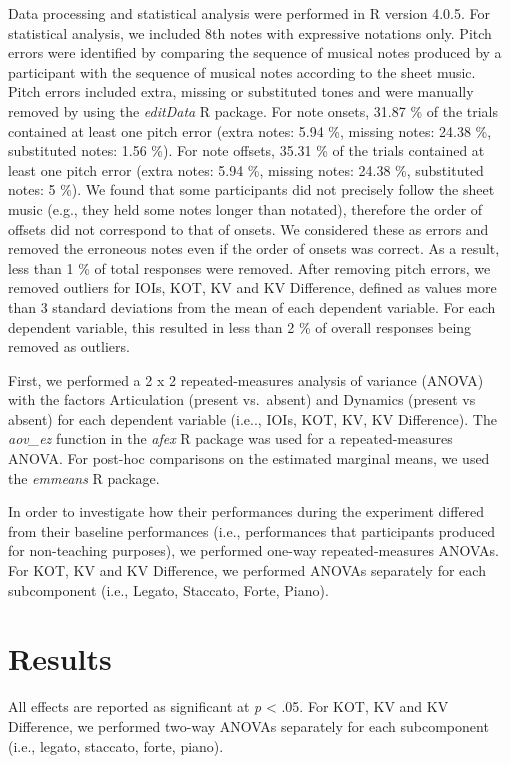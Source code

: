 \documentclass[
  man,floatsintext]{apa6}
\begin{document}
Data processing and statistical analysis were performed in R version 4.0.5. For statistical analysis, we included 8th notes with expressive notations only. Pitch errors were identified by comparing the sequence of musical notes produced by a participant with the sequence of musical notes according to the sheet music. Pitch errors included extra, missing or substituted tones and were manually removed by using the \emph{editData} R package. For note onsets, 31.87 \% of the trials contained at least one pitch error (extra notes: 5.94 \%, missing notes: 24.38 \%, substituted notes: 1.56 \%). For note offsets, 35.31 \% of the trials contained at least one pitch error (extra notes: 5.94 \%, missing notes: 24.38 \%, substituted notes: 5 \%). We found that some participants did not precisely follow the sheet music (e.g., they held some notes longer than notated), therefore the order of offsets did not correspond to that of onsets. We considered these as errors and removed the erroneous notes even if the order of onsets was correct. As a result, less than 1 \% of total responses were removed. After removing pitch errors, we removed outliers for IOIs, KOT, KV and KV Difference, defined as values more than 3 standard deviations from the mean of each dependent variable. For each dependent variable, this resulted in less than 2 \% of overall responses being removed as outliers.

First, we performed a 2 x 2 repeated-measures analysis of variance (ANOVA) with the factors Articulation (present vs.~absent) and Dynamics (present vs absent) for each dependent variable (i.e.., IOIs, KOT, KV, KV Difference). The \emph{aov\_ez} function in the \emph{afex} R package was used for a repeated-measures ANOVA. For post-hoc comparisons on the estimated marginal means, we used the \emph{emmeans} R package.

In order to investigate how their performances during the experiment differed from their baseline performances (i.e., performances that participants produced for non-teaching purposes), we performed one-way repeated-measures ANOVAs. For KOT, KV and KV Difference, we performed ANOVAs separately for each subcomponent (i.e., Legato, Staccato, Forte, Piano).

\hypertarget{results}{%
\section{Results}\label{results}}

All effects are reported as significant at \emph{p} \textless{} .05. For KOT, KV and KV Difference, we performed two-way ANOVAs separately for each subcomponent (i.e., legato, staccato, forte, piano).
\end{document}
